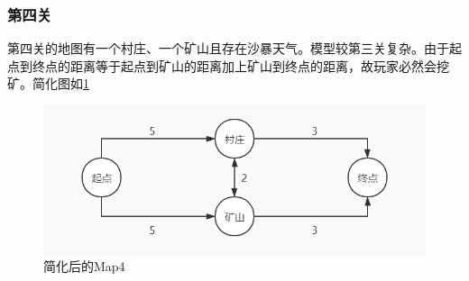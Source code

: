 \documentclass[withoutpreface,bwprint]{cumcmthesis} %
\begin{document}
\subsubsection{第四关}
第四关的地图有一个村庄、一个矿山且存在沙暴天气。模型较第三关复杂。由于起点到终点的距离等于起点到矿山的距离加上矿山到终点的距离，故玩家必然会挖矿。简化图如\cref{fig:map4}
\begin{figure}[H]
    \centering
    \includegraphics[scale=0.5]{figures/map4.jpg}
    \caption{简化后的Map4}
    \label{fig:map4}
\end{figure}
\end{document}
